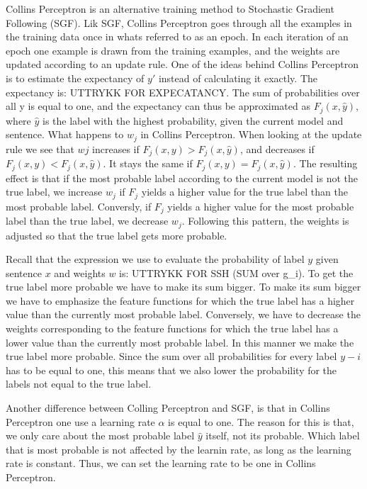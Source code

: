 \documentclass[12pt]{article}
\begin{document}
Collins Perceptron is an alternative training method to Stochastic Gradient Following (SGF). Lik SGF, Collins Perceptron goes through all the examples in the training data once in whats referred to as an epoch. In each iteration of an epoch one example is drawn from the training examples, and the weights are updated according to an update rule. One of the ideas behind Collins Perceptron is to estimate the expectancy of $y'$ instead of calculating it exactly. The expectancy is: UTTRYKK FOR EXPECATANCY. The sum of probabilities over all y is equal to one, and the expectancy can thus be approximated as $F_j(x, \hat y)$, where $\hat y$ is the label with the highest probability, given the current model and sentence. What happens to $w_j$ in Collins Perceptron. When looking at the update rule we see that $wj$ increases if $F_j(x, y) > F_j(x, \hat y)$, and decreases if $F_j(x, y) < F_j(x, \hat y)$. It stays the same if $F_j(x, y) = F_j(x, \hat y)$. The resulting effect is that if the most probable label according to the current model is not the true label, we increase $w_j$ if $F_j$ yields a higher value for the true label than the most probable label. Conversly, if $F_j$ yields a higher value for the most probable label than the true label, we decrease $w_j$. Following this pattern, the weights is adjusted so that the true label gets more probable. 

Recall that the expression we use to evaluate the probability of label $y$ given sentence $x$ and weights $w$ is: UTTRYKK FOR SSH (SUM over g_i). To get the true label more probable we have to make its sum bigger. To make its sum bigger we have to emphasize the feature functions for which the true label has a higher value than the currently most probable label. Conversely, we have to decrease the weights corresponding to the feature functions for which the true label has a lower value than the currently most probable label. In this manner we make the true label more probable. Since the sum over all probabilities for every label $y-i$ has to be equal to one, this means that we also lower the probability for the labels not equal to the true label. 

Another difference between Colling Perceptron and SGF, is that in Collins Perceptron one use a learning rate $\alpha$ is equal to one. The reason for this is that, we only care about the most probable label $\hat y$ itself, not its probable. Which label that is most probable is not affected by the learnin rate, as long as the learning rate is constant. Thus, we can set the learning rate to be one in Collins Perceptron. 
\end{document}
